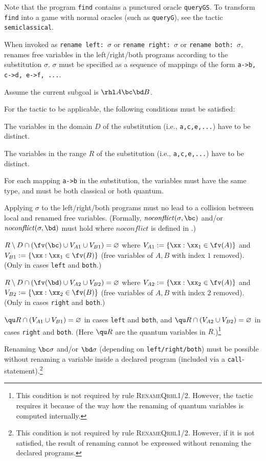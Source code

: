 \documentclass{article}
\renewcommand\ruleref[1]{rule \hbox{\textsc{#1}}}
\begin{document}
Note that the program \texttt{find} contains a punctured oracle
\texttt{queryGS}. To transform \texttt{find} into a game with normal
oracles (such as \texttt{queryG}), see the tactic
\texttt{semiclassical}.



When invoked as \texttt{rename left: $\sigma$} or \texttt{rename
  right: $\sigma$} or \texttt{rename both: $\sigma$}, renames free variables in the left/right/both programs
according to the substitution $\sigma$.  $\sigma$ must be specified as
a sequence of mappings of the form \texttt{a->b, c->d, e->f, ...}.

Assume the current subgoal is $\rhl A\bc\bd B$.

\medskip
\noindent
%
For the tactic to be applicable, the following conditions must be satisfied:
\begin{compactitem}
\item The variables in the domain $D$ of the substitution (i.e.,
  \texttt{a,c,e,...}) have to be distinct.
\item The variables in the range $R$ of the substitution (i.e.,
  \texttt{a,c,e,...}) have to be distinct.
\item For each mapping \texttt{a->b} in the substitution, the
  variables must have the same type, and must be both classical or
  both quantum.
\item Applying $\sigma$ to the left/right/both programs must no lead
  to a collision between local and renamed free variables.  (Formally,
  $\mathit{noconflict}(\sigma,\bc)$ and/or
  $\mathit{noconflict}(\sigma,\bd)$ must hold where
  $\mathit{noconflict}$ is defined in \cite{local-variables}.)
\item
  $R\setminus D \cap (\fv(\bc) \cup V_{A1} \cup V_{B1})=\varnothing$
  where $V_{A1} := \{\xx: \xx_1\in \fv(A)\}$ and
  $V_{B1} := \{\xx: \xx_1\in \fv(B)\}$ (free variables of $A,B$ with
  index $1$ removed).  (Only in cases \texttt{left} and
  \texttt{both}.)
\item
  $R\setminus D \cap (\fv(\bd) \cup V_{A2} \cup V_{B2})=\varnothing$
  where $V_{A2} := \{\xx: \xx_2\in \fv(A)\}$ and
  $V_{B2} := \{\xx: \xx_2\in \fv(B)\}$ (free variables of $A,B$ with
  index $2$ removed).  (Only in cases \texttt{right} and
  \texttt{both}.)
\item $\qu R \cap (V_{A1} \cup V_{B1}) = \varnothing$ in cases
  \texttt{left} and \texttt{both}, and
  $\qu R \cap (V_{A2} \cup V_{B2}) = \varnothing$ in cases
  \texttt{right} and \texttt{both}.  (Here $\qu R$ are the quantum
  variables in $R$.)\footnote{This condition is not required by
    \ruleref{RenameQrhl1/2}. However, the tactic requires it because
    of the way how the renaming of quantum variables is computed
    internally.}
\item Renaming $\bc\sigma$ and/or $\bd\sigma$ (depending on
  \texttt{left/right/both}) must be possible without renaming a
  variable inside a declared program (included via a
  \texttt{call}-statement).\footnote{This condition is not required by
    \ruleref{RenameQrhl1/2}. However, if it is not satisfied, the
    result of renaming cannot be expressed without renaming the
    declared programs.}
\end{compactitem}
\end{document}
